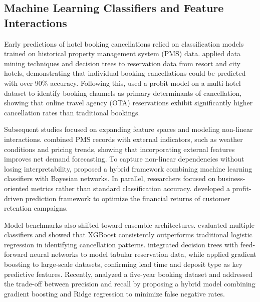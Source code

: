 \documentclass[pdflatex,sn-mathphys-ay]{sn-jnl}%
\theoremstyle{thmstyleone}%
\theoremstyle{thmstyletwo}%
\theoremstyle{thmstylethree}%
\begin{document}
\subsection{Machine Learning Classifiers and Feature Interactions}
Early predictions of hotel booking cancellations relied on classification models trained on historical property management system (PMS) data. \cite{antonio2017predicting} applied data mining techniques and decision trees to reservation data from resort and city hotels, demonstrating that individual booking cancellations could be predicted with over 90\% accuracy. Following this, \cite{falk2018modelling} used a probit model on a multi-hotel dataset to identify booking channels as primary determinants of cancellation, showing that online travel agency (OTA) reservations exhibit significantly higher cancellation rates than traditional bookings. 

Subsequent studies focused on expanding feature spaces and modeling non-linear interactions. \cite{antonio2019big} combined PMS records with external indicators, such as weather conditions and pricing trends, showing that incorporating external features improves net demand forecasting. To capture non-linear dependencies without losing interpretability, \cite{chen2023prediction} proposed a hybrid framework combining machine learning classifiers with Bayesian networks. In parallel, researchers focused on business-oriented metrics rather than standard classification accuracy. \cite{liu2023hospitality} developed a profit-driven prediction framework to optimize the financial returns of customer retention campaigns. 

Model benchmarks also shifted toward ensemble architectures. \cite{yoo2024predicting} evaluated multiple classifiers and showed that XGBoost consistently outperforms traditional logistic regression in identifying cancellation patterns. \cite{yang2024predicting} integrated decision trees with feed-forward neural networks to model tabular reservation data, while \cite{luo2025hotel} applied gradient boosting to large-scale datasets, confirming lead time and deposit type as key predictive features. Recently, \cite{ampountolas2025predicting} analyzed a five-year booking dataset and addressed the trade-off between precision and recall by proposing a hybrid model combining gradient boosting and Ridge regression to minimize false negative rates.
\end{document}
